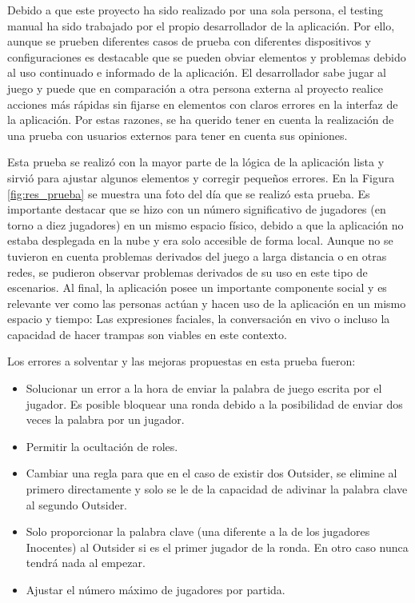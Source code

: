 Debido a que este proyecto ha sido realizado por una sola persona, el testing manual ha sido trabajado por el propio desarrollador de la aplicación.
Por ello, aunque se prueben diferentes casos de prueba con diferentes dispositivos y configuraciones es destacable que se pueden obviar elementos y problemas
debido al uso continuado e informado de la aplicación. El desarrollador sabe jugar al juego y puede que en comparación a otra persona externa al 
proyecto realice acciones más rápidas sin fijarse en elementos con claros errores en la interfaz de la aplicación. Por estas razones, se ha querido tener
en cuenta la realización de una prueba con usuarios externos para tener en cuenta sus opiniones.

Esta prueba se realizó con la mayor parte de la lógica de la aplicación lista y sirvió para ajustar algunos elementos y corregir pequeños errores.
En la Figura \ref{fig:res_prueba} se muestra una foto del día que se realizó esta prueba. Es importante destacar que se hizo con un número
significativo de jugadores (en torno a diez jugadores) en un mismo
espacio físico, debido a que la aplicación no estaba desplegada en la nube y era solo accesible de forma local. Aunque no se tuvieron en cuenta problemas derivados
del juego a larga distancia o en otras redes, se pudieron observar problemas derivados de su uso en este tipo de escenarios. Al final, la 
aplicación posee un importante componente social y es relevante ver como las personas actúan y hacen uso de la aplicación en un mismo espacio y tiempo: Las
expresiones faciales, la conversación en vivo o incluso la capacidad de hacer trampas son viables en este contexto.

Los errores a solventar y las mejoras propuestas en esta prueba fueron:

\begin{itemize}
	\item Solucionar un error a la hora de enviar la palabra de juego escrita por el jugador. Es posible bloquear una ronda debido a la posibilidad de enviar dos veces
	 	  la palabra por un jugador.
	\item Permitir la ocultación de roles.
	\item Cambiar una regla para que en el caso de existir dos Outsider, se elimine al primero directamente y solo se le de la capacidad de adivinar
		  la palabra clave al segundo Outsider.
	\item Solo proporcionar la palabra clave (una diferente a la de los jugadores Inocentes) al Outsider si es el primer jugador de la ronda. 
		  En otro caso nunca tendrá nada al empezar.
	\item Ajustar el número máximo de jugadores por partida.
\end{itemize}

